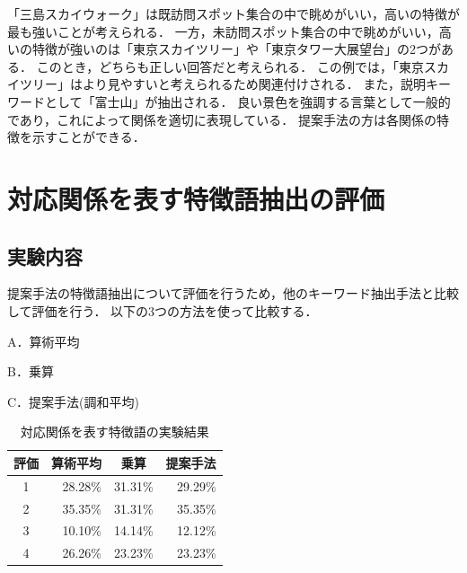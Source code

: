\documentclass[submit]{ipsj}
\begin{document}
「三島スカイウォーク」は既訪問スポット集合の中で眺めがいい，高いの特徴が最も強いことが考えられる．
一方，未訪問スポット集合の中で眺めがいい，高いの特徴が強いのは「東京スカイツリー」や「東京タワー大展望台」の2つがある．
このとき，どちらも正しい回答だと考えられる．
この例では，「東京スカイツリー」はより見やすいと考えられるため関連付けされる．
また，説明キーワードとして「富士山」が抽出される．
良い景色を強調する言葉として一般的であり，これによって関係を適切に表現している．
提案手法の方は各関係の特徴を示すことができる．

\section{対応関係を表す特徴語抽出の評価}
\label{sec:対応関係を表す特徴語抽出の評価}
\subsection{実験内容}
提案手法の特徴語抽出について評価を行うため，他のキーワード抽出手法と比較して評価を行う．
以下の3つの方法を使って比較する．
\begin{description}
  \item A．算術平均
  \item B．乗算
  \item C．提案手法(調和平均)
\end{description}

\begin{table}[t]
  \caption{対応関係を表す特徴語の実験結果}
  \label{table:対応関係を表す特徴語の実験結果}
  \centering
  \begin{tabular}{c|r|r|r}
  \hline
  評価 & \multicolumn{1}{c|}{算術平均} & \multicolumn{1}{c|}{乗算} & \multicolumn{1}{c}{提案手法} \\ \hline
  1  & 28.28\%                  & 31.31\%                  & 29.29\%                 \\
  2  & 35.35\%                  & 31.31\%                  & 35.35\%                 \\
  3  & 10.10\%                   & 14.14\%                  & 12.12\%                 \\
  4  & 26.26\%                  & 23.23\%                  & 23.23\%                 \\ \hline
  \end{tabular}
\end{table}
\end{document}
